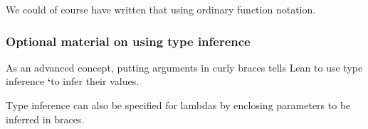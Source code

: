 \documentclass[letterpaper,10pt,english]{sphinxmanual}
\begin{document}
We could of course have written that using ordinary function notation.

\begin{sphinxVerbatim}[commandchars=\\\{\}]
 
              
         
\end{sphinxVerbatim}


\subsubsection{Optional material on using type inference}
\label{\detokenize{15-proofs:optional-material-on-using-type-inference}}
As an advanced concept, putting arguments in curly braces tells Lean
to use type inference {\color{red}\bfseries{}{}`}to infer their values.

\begin{sphinxVerbatim}[commandchars=\\\{\}]
 
              
         
\end{sphinxVerbatim}

Type inference can also be specified for lambdas by enclosing
parameters to be inferred in braces.

\begin{sphinxVerbatim}[commandchars=\\\{\}]
             
                 
\end{sphinxVerbatim}
\end{document}
